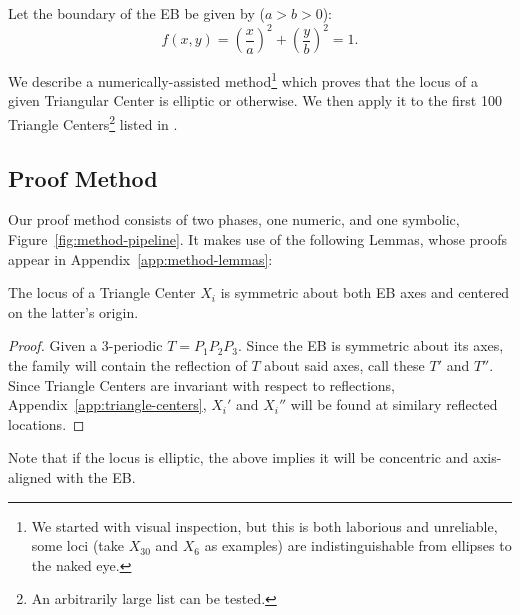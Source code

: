 Let the boundary of the EB be given by ($a>b>0$):
\begin{equation}
f(x,y)=\left(\frac{x}{a}\right)^2+\left(\frac{y}{b}\right)^2=1.
\label{eqn:billiard-f}
\end{equation}

We describe a numerically-assisted method\footnote{We started with visual inspection, but this is both laborious and unreliable, some loci (take $X_{30}$ and $X_6$ as examples) are indistinguishable from ellipses to the naked eye.} which proves that the locus of a given Triangular Center is elliptic or otherwise. We then apply it to the first 100 Triangle Centers\footnote{An arbitrarily large list can be tested.} listed in \cite{etc}.

\subsection{Proof Method}

Our proof method consists of two phases, one numeric, and one symbolic, Figure~\ref{fig:method-pipeline}. It makes use of the following Lemmas, whose proofs appear in Appendix~\ref{app:method-lemmas}:

\begin{lemma}
The locus of a Triangle Center $X_i$ is symmetric about both EB axes and centered on the latter's origin.
\label{lem:axisymmetric}
\end{lemma}

\begin{proof} 
Given a 3-periodic $T=P_1P_2P_3$. Since the EB is symmetric about its axes, the family will contain the reflection of $T$ about said axes, call these $T'$ and $T''$. Since Triangle Centers are invariant with respect to reflections, Appendix~\ref{app:triangle-centers}, $X_i'$ and $X_i''$ will be found at similary reflected locations.
\end{proof}

Note that  if the locus is elliptic, the above implies it will be concentric and axis-aligned with the EB.


%

